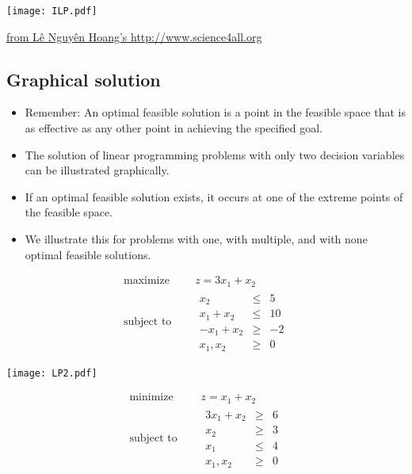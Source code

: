   \begin{center}
    \texttt{[image: ILP.pdf]}

    \href{http://www.science4all.org/article/integer-programming/}{from Lê Nguyên Hoang's http://www.science4all.org}
  \end{center}

\subsection{Graphical solution}

  \begin{itemize}
    \item Remember: An optimal feasible solution is a point in the feasible space that is as effective as any other point in achieving the specified goal.
    \item The solution of linear programming problems with only two decision variables can be illustrated graphically.
    \item If an optimal feasible solution exists, it occurs at one of the extreme points of the feasible space.
    \item We illustrate this for problems with one, with multiple, and with none optimal feasible solutions.
  \end{itemize}

  \begin{Exercise}
    \begin{equation*}
      \begin{aligned}
        \text{maximize } \quad & z = 3x_1 + x_2 \\
        \text{subject to }\quad &
        \begin{array}{rcl}
          x_2 & \leq & 5\\
          x_1 + x_2 &\leq& 10\\
          -x_1+x_2 &\geq& -2\\
          x_1,x_2 &\geq &0
        \end{array}
      \end{aligned}
    \end{equation*}
  \end{Exercise}
  \begin{center}
    \texttt{[image: LP2.pdf]}
  \end{center}
  \begin{Exercise}
    \begin{equation*}
      \begin{aligned}
        \text{minimize } \quad & z = x_1 + x_2 \\
        \text{subject to }\quad &
        \begin{array}{rcl}
          3x_1 + x_2 & \geq & 6\\
          x_2 &\geq& 3\\
          x_1 &\leq& 4\\
          x_1,x_2 &\geq &0
        \end{array}
      \end{aligned}
    \end{equation*}
  \end{Exercise}

